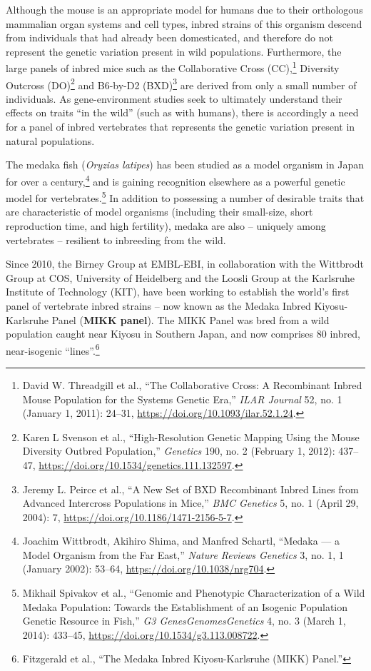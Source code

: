 \documentclass[
]{book}
\begin{document}
Although the mouse is an appropriate model for humans due to their orthologous mammalian organ systems and cell types, inbred strains of this organism descend from individuals that had already been domesticated, and therefore do not represent the genetic variation present in wild populations. Furthermore, the large panels of inbred mice such as the Collaborative Cross (CC),\footnote{David W. Threadgill et al., {``The {Collaborative Cross}: {A Recombinant Inbred Mouse Population} for the {Systems Genetic Era},''} \emph{ILAR Journal} 52, no. 1 (January 1, 2011): 24--31, \url{https://doi.org/10.1093/ilar.52.1.24}.} Diversity Outcross (DO)\footnote{Karen L Svenson et al., {``High-{Resolution Genetic Mapping Using} the {Mouse Diversity Outbred Population},''} \emph{Genetics} 190, no. 2 (February 1, 2012): 437--47, \url{https://doi.org/10.1534/genetics.111.132597}.} and B6-by-D2 (BXD)\footnote{Jeremy L. Peirce et al., {``A New Set of {BXD} Recombinant Inbred Lines from Advanced Intercross Populations in Mice,''} \emph{BMC Genetics} 5, no. 1 (April 29, 2004): 7, \url{https://doi.org/10.1186/1471-2156-5-7}.} are derived from only a small number of individuals. As gene-environment studies seek to ultimately understand their effects on traits ``in the wild'' (such as with humans), there is accordingly a need for a panel of inbred vertebrates that represents the genetic variation present in natural populations.

The medaka fish (\emph{Oryzias latipes}) has been studied as a model organism in Japan for over a century,\footnote{Joachim Wittbrodt, Akihiro Shima, and Manfred Schartl, {``Medaka --- a Model Organism from the Far East,''} \emph{Nature Reviews Genetics} 3, no. 1, 1 (January 2002): 53--64, \url{https://doi.org/10.1038/nrg704}.} and is gaining recognition elsewhere as a powerful genetic model for vertebrates.\footnote{Mikhail Spivakov et al., {``Genomic and {Phenotypic Characterization} of a {Wild Medaka Population}: {Towards} the {Establishment} of an {Isogenic Population Genetic Resource} in {Fish},''} \emph{G3 Genes\textbar Genomes\textbar Genetics} 4, no. 3 (March 1, 2014): 433--45, \url{https://doi.org/10.1534/g3.113.008722}.} In addition to possessing a number of desirable traits that are characteristic of model organisms (including their small-size, short reproduction time, and high fertility), medaka are also -- uniquely among vertebrates -- resilient to inbreeding from the wild.

Since 2010, the Birney Group at EMBL-EBI, in collaboration with the Wittbrodt Group at COS, University of Heidelberg and the Loosli Group at the Karlsruhe Institute of Technology (KIT), have been working to establish the world's first panel of vertebrate inbred strains -- now known as the Medaka Inbred Kiyosu-Karlsruhe Panel (\textbf{MIKK panel}). The MIKK Panel was bred from a wild population caught near Kiyosu in Southern Japan, and now comprises 80 inbred, near-isogenic ``lines''.\footnote{Fitzgerald et al., {``The {Medaka Inbred Kiyosu-Karlsruhe} ({MIKK}) Panel.''}}
\end{document}
